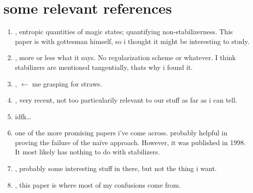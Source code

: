 \section{some relevant references}
\begin{enumerate}
  \item {}, entropic quantities of
    magic states; quantifying non-stabilizerness. This paper is with gottesman
    himself, so i thought it might be interesting to study. 
  \item {}, more or less what
    it says. No regularization scheme or whatever. I think stabilizers are
    mentioned tangentially, thats why i found it.
  \item {}, $\leftarrow$ me
    grasping for straws.
  \item {}, very recent, not too
    particularily relevant to our stuff as far as i can tell.
  \item {} idfk\ldots
  \item {} one of the more
    promising papers i've come across. probably helpful in proving the failure
    of the na\"ive approach. However, it was published in 1998. It most likely
    has nothing to do with stabilizers.
  \item {}, probably some interesting
    stuff in there, but not the thing i want.
  \item {}, this paper is where most
    of my confusions come from. 
\end{enumerate}
